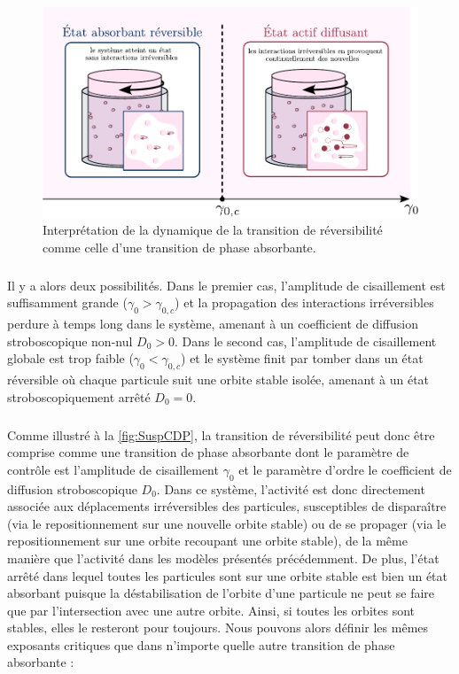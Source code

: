 \begin{figure}[h]
	\centering
	\includegraphics[width=\textwidth]{Chapitre1/Figures/InterpretationCDP/SuspensionsAPT.pdf}
	\caption{Interprétation de la dynamique de la transition de réversibilité comme celle d'une transition de phase absorbante.}
	\label{fig:SuspCDP}
\end{figure}

\subparagraph{}Il y a alors deux possibilités. Dans le premier cas, l'amplitude de cisaillement est suffisamment grande ($\gamma_0 > \gamma_{0,c}$) et la propagation des interactions irréversibles perdure à temps long dans le système, amenant à un coefficient de diffusion stroboscopique non-nul $D_0 >0$. Dans le second cas, l'amplitude de cisaillement globale est trop faible ($\gamma_0 < \gamma_{0,c}$) et le système finit par tomber dans un état réversible où chaque particule suit une orbite stable isolée, amenant à un état stroboscopiquement arrêté $D_0 = 0$.

\subparagraph{}Comme illustré à la \autoref{fig:SuspCDP}, la transition de réversibilité peut donc être comprise comme une transition de phase absorbante dont le paramètre de contrôle est l'amplitude de cisaillement $\gamma_0$ et le paramètre d'ordre le coefficient de diffusion stroboscopique $D_0$. Dans ce système, l'activité est donc directement associée aux déplacements irréversibles des particules, susceptibles de disparaître (via le repositionnement sur une nouvelle orbite stable) ou de se propager (via le repositionnement sur une orbite recoupant une orbite stable), de la même manière que l'activité dans les modèles présentés précédemment. De plus, l'état arrêté dans lequel toutes les particules sont sur une orbite stable est bien un état absorbant puisque la déstabilisation de l'orbite d'une particule ne peut se faire que par l'intersection avec une autre orbite. Ainsi, si toutes les orbites sont stables, elles le resteront pour toujours. Nous pouvons alors définir les mêmes exposants critiques que dans n'importe quelle autre transition de phase absorbante :

